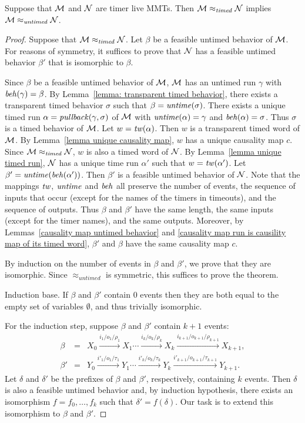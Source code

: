 \begin{theorem}
\label{timedimpliesuntimed}
Suppose that ${\mathcal M}$ and ${\mathcal N}$ are timer live MMTs. Then
${\mathcal M} \approx_{\mathit{timed}} {\mathcal N}$
implies
${\mathcal M} \approx_{\mathit{untimed}} {\mathcal N}$.
\end{theorem}
\iflong
\begin{proof}
Suppose that ${\mathcal M} \approx_{\mathit{timed}} {\mathcal N}$.
Let $\beta$ be a feasible untimed behavior of ${\mathcal M}$.
For reasons of symmetry, it suffices to prove that ${\mathcal N}$ has a feasible untimed behavior $\beta'$ that is isomorphic to $\beta$.

Since $\beta$ be a feasible untimed behavior of ${\mathcal M}$, ${\mathcal M}$ has an untimed run $\gamma$ with $\mathit{beh}(\gamma) = \beta$.
By Lemma~\ref{lemma: transparent timed behavior}, there exists a 
transparent timed behavior $\sigma$ such that $\beta = \mathit{untime}(\sigma)$.
There exists a unique timed run $\alpha = \mathit{pullback}(\gamma,\sigma)$ of ${\mathcal M}$ with $\mathit{untime}(\alpha) = \gamma$ and $\mathit{beh}(\alpha) = \sigma$.
Thus $\sigma$ is a timed behavior of ${\mathcal M}$.
Let  $w = \mathit{tw}(\alpha)$.
Then $w$ is a transparent timed word of ${\mathcal M}$.
By Lemma~\ref{lemma unique causality map}, $w$ has a unique causality map $c$.
Since ${\mathcal M} \approx_{\mathit{timed}} {\mathcal N}$, $w$ is also a timed word of ${\mathcal N}$.
By Lemma~\ref{lemma unique timed run}, ${\mathcal N}$ has a unique time run $\alpha'$ such that $w = \mathit{tw}(\alpha')$.
Let $\beta' = \mathit{untime}(\mathit{beh}(\alpha'))$.
Then $\beta'$ is a feasible untimed behavior of ${\mathcal N}$.
Note that the mappings $\mathit{tw}$, $\mathit{untime}$ and $\mathit{beh}$ all preserve the number of events, the sequence of inputs that occur (except for the names of the timers in timeouts), and the sequence of outputs. Thus $\beta$ and $\beta'$ have the same length, the same inputs (except for the timer names), and the same outputs.
Moreover, by Lemmas~\ref{causality map untimed behavior} and \ref{causality map run is causility map of its timed word},
$\beta'$ and $\beta$ have the same causality map $c$.

By induction on the number of events in $\beta$ and $\beta'$, we prove that they are isomorphic.
Since $\approx_{\mathit{untimed}}$ is symmetric, this suffices to prove the theorem.

Induction base. If $\beta$ and $\beta'$ contain $0$ events then they are both equal to the empty set of variables $\emptyset$,
and thus trivially isomorphic.

For the induction step, suppose $\beta$ and $\beta'$ contain $k+1$ events:
\begin{eqnarray*}
\beta & = & X_0 \xrightarrow{i_1/o_1/\rho_1} X_1 \cdots \xrightarrow{i_k/o_k/\rho_k} X_{k}
 \xrightarrow{i_{k+1}/o_{k+1}/\rho_{k+1}} X_{k+1},\\
\beta' & = & Y_0 \xrightarrow{i'_1/o_1/\tau_1} Y_1  \cdots \xrightarrow{i'_k/o_k/\tau_k} Y_{k} 
 \xrightarrow{i'_{k+1}/o_{k+1}/\tau_{k+1}} Y_{k+1}.
\end{eqnarray*}
Let $\delta$ and $\delta'$ be the prefixes of $\beta$ and $\beta'$, respectively,
containing $k$ events. Then $\delta$ is also a feasible untimed behavior and, by
induction hypothesis, there exists an isomorphism $f = f_0 ,\ldots, f_k$ such that $\delta' = f(\delta)$.
Our task is to extend this isomorphism to $\beta$ and $\beta'$.


\end{proof}
